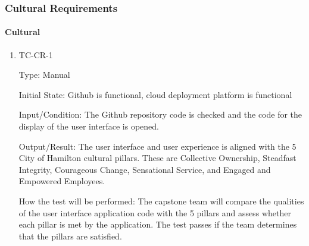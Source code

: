 \documentclass[12pt, titlepage]{article}
\begin{document}

\subsubsection{Cultural Requirements}

\paragraph{Cultural}

\begin{enumerate}
  \item{TC-CR-1\\}

    Type: Manual

    Initial State: Github is functional, cloud deployment platform is functional

    Input/Condition: The Github repository code is checked and the code for the
    display of the user interface is opened.

    Output/Result: The user interface and user experience is aligned with the 5
    City of Hamilton cultural pillars. These are Collective Ownership,
    Steadfast Integrity, Courageous Change, Sensational Service, and
    Engaged and Empowered Employees.

    How the test will be performed: The capstone team will compare the qualities
    of the user interface application code with the 5 pillars and assess whether
    each pillar is met by the application. The test passes if the
    team determines
    that the pillars are satisfied.
\end{enumerate}
\end{document}

